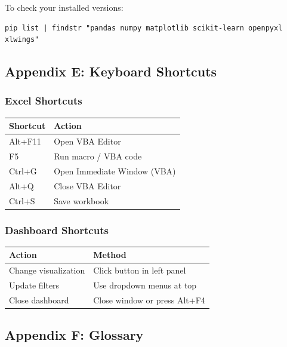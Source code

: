 \documentclass[11pt,a4paper]{article}
\begin{document}
To check your installed versions:
\begin{lstlisting}[style=shellstyle]
pip list | findstr "pandas numpy matplotlib scikit-learn openpyxl xlwings"
\end{lstlisting}

\newpage

\subsection{Appendix E: Keyboard Shortcuts}

\subsubsection{Excel Shortcuts}

\begin{table}[h]
\centering
\begin{tabular}{@{} l l @{}}
\toprule
\textbf{Shortcut} & \textbf{Action} \\
\midrule
Alt+F11 & Open VBA Editor \\
F5 & Run macro / VBA code \\
Ctrl+G & Open Immediate Window (VBA) \\
Alt+Q & Close VBA Editor \\
Ctrl+S & Save workbook \\
\bottomrule
\end{tabular}
\end{table}

\subsubsection{Dashboard Shortcuts}

\begin{table}[h]
\centering
\begin{tabular}{@{} l l @{}}
\toprule
\textbf{Action} & \textbf{Method} \\
\midrule
Change visualization & Click button in left panel \\
Update filters & Use dropdown menus at top \\
Close dashboard & Close window or press Alt+F4 \\
\bottomrule
\end{tabular}
\end{table}

\subsection{Appendix F: Glossary}
\end{document}
